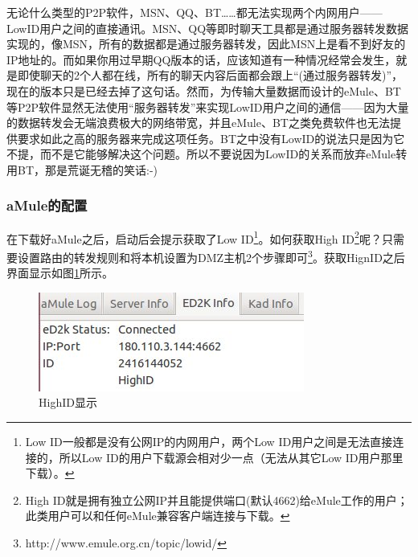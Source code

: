 \documentclass[paper=a4,fontsize=11pt]{article}
\begin{document}
	无论什么类型的P2P软件，MSN、QQ、BT……都无法实现两个内网用户——LowID用户之间的直接通讯。MSN、QQ等即时聊天工具都是通过服务器转发数据实现的，像MSN，所有的数据都是通过服务器转发，因此MSN上是看不到好友的IP地址的。而如果你用过早期QQ版本的话，应该知道有一种情况经常会发生，就是即使聊天的2个人都在线，所有的聊天内容后面都会跟上“(通过服务器转发)”，现在的版本只是已经去掉了这句话。然而，为传输大量数据而设计的eMule、BT等P2P软件显然无法使用“服务器转发”来实现LowID用户之间的通信——因为大量的数据转发会无端浪费极大的网络带宽，并且eMule、BT之类免费软件也无法提供要求如此之高的服务器来完成这项任务。BT之中没有LowID的说法只是因为它不提，而不是它能够解决这个问题。所以不要说因为LowID的关系而放弃eMule转用BT，那是荒诞无稽的笑话:-)
		
	\subsubsection{aMule的配置}
	在下载好aMule之后，启动后会提示获取了Low ID\footnote{Low ID一般都是没有公网IP的内网用户，两个Low ID用户之间是无法直接连接的，所以Low ID的用户下载源会相对少一点（无法从其它Low ID用户那里下载）。}。如何获取High ID\footnote{High ID就是拥有独立公网IP并且能提供端口(默认4662)给eMule工作的用户；此类用户可以和任何eMule兼容客户端连接与下载。}呢？只需要设置路由的转发规则和将本机设置为DMZ主机2个步骤即可\footnote{http://www.emule.org.cn/topic/lowid/}。获取HignID之后界面显示如图\ref{GetHighID}所示。
	
	\begin{figure}[htbp]
		\centering
		\includegraphics[scale=0.8]{GetHighID.jpeg}
		\caption{HighID显示}
		\label{GetHighID}
	\end{figure}
	
\end{document}
